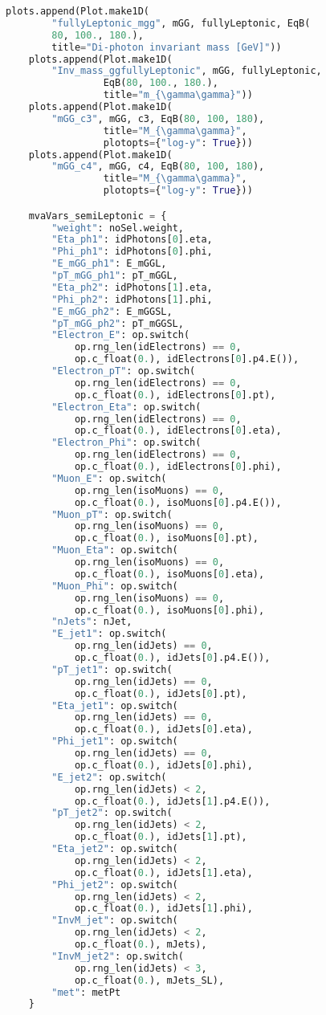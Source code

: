 \begin{lstlisting}[language=Python, caption=Python module of the analysis used in Bamboo framework, label={bamboocode}]
    plots.append(Plot.make1D(
        "fullyLeptonic_mgg", mGG, fullyLeptonic, EqB(
        80, 100., 180.),
        title="Di-photon invariant mass [GeV]"))
    plots.append(Plot.make1D(
        "Inv_mass_ggfullyLeptonic", mGG, fullyLeptonic,
                 EqB(80, 100., 180.),
                 title="m_{\gamma\gamma}"))
    plots.append(Plot.make1D(
        "mGG_c3", mGG, c3, EqB(80, 100, 180),
                 title="M_{\gamma\gamma}",
                 plotopts={"log-y": True}))
    plots.append(Plot.make1D(
        "mGG_c4", mGG, c4, EqB(80, 100, 180),
                 title="M_{\gamma\gamma}",
                 plotopts={"log-y": True}))

    mvaVars_semiLeptonic = {
        "weight": noSel.weight,
        "Eta_ph1": idPhotons[0].eta,
        "Phi_ph1": idPhotons[0].phi,
        "E_mGG_ph1": E_mGGL,
        "pT_mGG_ph1": pT_mGGL,
        "Eta_ph2": idPhotons[1].eta,
        "Phi_ph2": idPhotons[1].phi,
        "E_mGG_ph2": E_mGGSL,
        "pT_mGG_ph2": pT_mGGSL,
        "Electron_E": op.switch(
            op.rng_len(idElectrons) == 0,
            op.c_float(0.), idElectrons[0].p4.E()),
        "Electron_pT": op.switch(
            op.rng_len(idElectrons) == 0,
            op.c_float(0.), idElectrons[0].pt),
        "Electron_Eta": op.switch(
            op.rng_len(idElectrons) == 0,
            op.c_float(0.), idElectrons[0].eta),
        "Electron_Phi": op.switch(
            op.rng_len(idElectrons) == 0,
            op.c_float(0.), idElectrons[0].phi),
        "Muon_E": op.switch(
            op.rng_len(isoMuons) == 0,
            op.c_float(0.), isoMuons[0].p4.E()),
        "Muon_pT": op.switch(
            op.rng_len(isoMuons) == 0,
            op.c_float(0.), isoMuons[0].pt),
        "Muon_Eta": op.switch(
            op.rng_len(isoMuons) == 0,
            op.c_float(0.), isoMuons[0].eta),
        "Muon_Phi": op.switch(
            op.rng_len(isoMuons) == 0,
            op.c_float(0.), isoMuons[0].phi),
        "nJets": nJet,
        "E_jet1": op.switch(
            op.rng_len(idJets) == 0,
            op.c_float(0.), idJets[0].p4.E()),
        "pT_jet1": op.switch(
            op.rng_len(idJets) == 0,
            op.c_float(0.), idJets[0].pt),
        "Eta_jet1": op.switch(
            op.rng_len(idJets) == 0,
            op.c_float(0.), idJets[0].eta),
        "Phi_jet1": op.switch(
            op.rng_len(idJets) == 0,
            op.c_float(0.), idJets[0].phi),
        "E_jet2": op.switch(
            op.rng_len(idJets) < 2,
            op.c_float(0.), idJets[1].p4.E()),
        "pT_jet2": op.switch(
            op.rng_len(idJets) < 2,
            op.c_float(0.), idJets[1].pt),
        "Eta_jet2": op.switch(
            op.rng_len(idJets) < 2,
            op.c_float(0.), idJets[1].eta),
        "Phi_jet2": op.switch(
            op.rng_len(idJets) < 2,
            op.c_float(0.), idJets[1].phi),
        "InvM_jet": op.switch(
            op.rng_len(idJets) < 2,
            op.c_float(0.), mJets),
        "InvM_jet2": op.switch(
            op.rng_len(idJets) < 3,
            op.c_float(0.), mJets_SL),
        "met": metPt
    }


\end{lstlisting}
